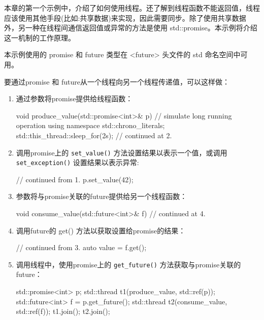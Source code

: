 本章的第一个示例中，介绍了如何使用线程。还了解到线程函数不能返回值，线程应该使用其他手段(比如:共享数据)来实现，因此需要同步。除了使用共享数据外，另一种在线程间通信返回值或异常的方法是使用 std::promise。本示例将介绍这一机制的工作原理。


本示例使用的 promise 和 future 类型在 <future> 头文件的 std 命名空间中可用。


要通过promise 和 future从一个线程向另一个线程传递值，可以这样做：

\begin{enumerate}
\item
通过参数将promise提供给线程函数：

\begin{cpp}
void produce_value(std::promise<int>& p)
{
    // simulate long running operation
    {
        using namespace std::chrono_literals;
        std::this_thread::sleep_for(2s);
    }
    // continued at 2.
}
\end{cpp}

\item
调用promise上的 \verb|set_value()| 方法设置结果以表示一个值，或调用 \verb|set_exception()| 设置结果以表示异常:

\begin{cpp}
// continued from 1.
p.set_value(42);
\end{cpp}

\item
参数将与promise关联的future提供给另一个线程函数：

\begin{cpp}
void consume_value(std::future<int>& f)
{
    // continued at 4.
}
\end{cpp}

\item
调用future的 get() 方法以获取设置给promise的结果：

\begin{cpp}
// continued from 3.
auto value = f.get();
\end{cpp}

\item
调用线程中，使用promise上的 \verb|get_future()| 方法获取与promise关联的future：

\begin{cpp}
std::promise<int> p;
std::thread t1(produce_value, std::ref(p));
std::future<int> f = p.get_future();
std::thread t2(consume_value, std::ref(f));
t1.join();
t2.join();
\end{cpp}
\end{enumerate}

